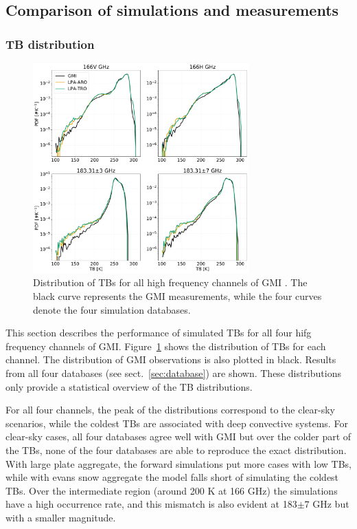 \documentclass[amt, manuscript]{copernicus}
\begin{document}
\subsection{Comparison of simulations and measurements}

\subsubsection{TB distribution}

\begin{figure}[t]
	\includegraphics[width=8.3cm]{Figures/PDF_TB_jan.pdf}
	\caption{Distribution of TBs for all high frequency channels of GMI . The black curve represents the GMI measurements, while the four curves denote the four simulation databases.}
	\label{fig:hist_TB}
\end{figure}

This section describes the performance of simulated TBs for all four hifg frequency channels of GMI. Figure~\ref{fig:hist_TB} shows the distribution of TBs for each channel. The distribution of GMI observations is also plotted in black. Results from all four databases (see sect.~\ref{sec:database}) are shown. These distributions only provide a statistical overview of the TB distributions. 

For all four channels, the peak of the distributions correspond to the clear-sky scenarios, while the coldest TBs are associated with deep convective systems. For clear-sky cases, all four databases agree well with GMI but over the colder part of the TBs, none of the four databases are able to reproduce the exact distribution. With large plate aggregate, the forward simulations put more cases with low TBs, while with evans snow aggregate the model falls short of simulating the coldest TBs. Over the intermediate region (around 200\,\,K at 166 GHz) the simulations have a high occurrence rate, and this mismatch is also evident at 183$\pm7$\,\,GHz but with a smaller magnitude.
\end{document}

